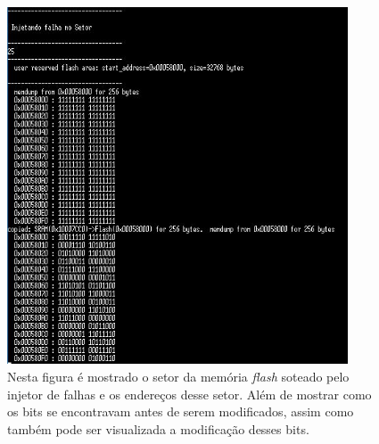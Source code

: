 \begin{figure}
	\centering
	\includegraphics[width=0.9\textwidth]{figuras/injecaoFlash.jpg}
	\caption[Injeção de Falhas na Memória \textit{Flash}]{Nesta figura é mostrado o setor da memória \textit{flash} soteado pelo injetor de falhas e os endereços desse setor. Além de mostrar como os bits se encontravam antes de serem modificados, assim como também pode ser visualizada a modificação desses bits.}
	\label{Img:injecaoFlash}	
\end{figure}